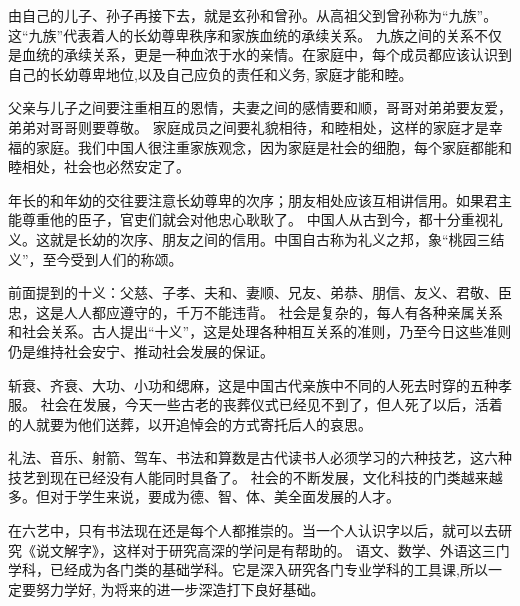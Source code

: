 \documentclass[avery5371,grid]{flashcards}
\begin{document}
{由自己的儿子、孙子再接下去，就是玄孙和曾孙。从高祖父到曾孙称为“九族”。这“九族”代表着人的长幼尊卑秩序和家族血统的承续关系。} %
{九族之间的关系不仅是血统的承续关系，更是一种血浓于水的亲情。在家庭中，每个成员都应该认识到自己的长幼尊卑地位,以及自己应负的责任和义务, 家庭才能和睦。} %

{父亲与儿子之间要注重相互的恩情，夫妻之间的感情要和顺，哥哥对弟弟要友爱，弟弟对哥哥则要尊敬。} %
{家庭成员之间要礼貌相待，和睦相处，这样的家庭才是幸福的家庭。我们中国人很注重家族观念，因为家庭是社会的细胞，每个家庭都能和睦相处，社会也必然安定了。} %

{年长的和年幼的交往要注意长幼尊卑的次序；朋友相处应该互相讲信用。如果君主能尊重他的臣子，官吏们就会对他忠心耿耿了。} %
{中国人从古到今，都十分重视礼义。这就是长幼的次序、朋友之间的信用。中国自古称为礼义之邦，象“桃园三结义”，至今受到人们的称颂。} %




{前面提到的十义：父慈、子孝、夫和、妻顺、兄友、弟恭、朋信、友义、君敬、臣忠，这是人人都应遵守的，千万不能违背。} %
{社会是复杂的，每人有各种亲属关系和社会关系。古人提出“十义”，这是处理各种相互关系的准则，乃至今日这些准则仍是维持社会安宁、推动社会发展的保证。} %

{斩衰、齐衰、大功、小功和缌麻，这是中国古代亲族中不同的人死去时穿的五种孝服。} %
{社会在发展，今天一些古老的丧葬仪式已经见不到了，但人死了以后，活着的人就要为他们送葬，以开追悼会的方式寄托后人的哀思。} %

{礼法、音乐、射箭、驾车、书法和算数是古代读书人必须学习的六种技艺，这六种技艺到现在已经没有人能同时具备了。} %
{社会的不断发展，文化科技的门类越来越多。但对于学生来说，要成为德、智、体、美全面发展的人才。} %

{在六艺中，只有书法现在还是每个人都推崇的。当一个人认识字以后，就可以去研究《说文解字》，这样对于研究高深的学问是有帮助的。} %
{语文、数学、外语这三门学科，已经成为各门类的基础学科。它是深入研究各门专业学科的工具课,所以一定要努力学好, 为将来的进一步深造打下良好基础。} %
\end{document}
